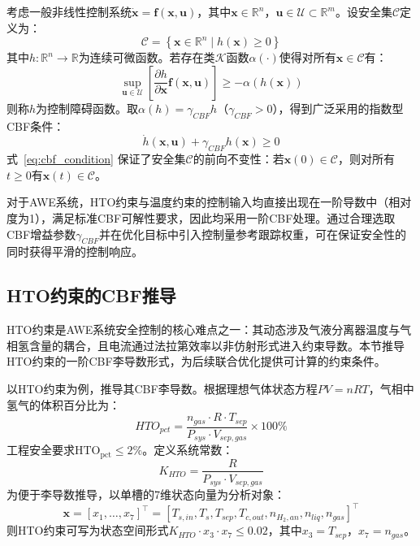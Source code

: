 考虑一般非线性控制系统$\dot{\mathbf{x}} = \mathbf{f}(\mathbf{x}, \mathbf{u})$，其中$\mathbf{x}\in\mathbb{R}^n$，$\mathbf{u}\in\mathcal{U}\subset\mathbb{R}^m$。设安全集$\mathcal{C}$定义为：
\begin{equation}
  \mathcal{C} = \left\{ \mathbf{x}\in\mathbb{R}^n \mid h(\mathbf{x}) \ge 0 \right\}
\end{equation}
其中$h: \mathbb{R}^n \to \mathbb{R}$为连续可微函数。若存在类$\mathcal{K}$函数$\alpha(\cdot)$使得对所有$\mathbf{x}\in\mathcal{C}$有：
\begin{equation}
  \sup_{\mathbf{u}\in\mathcal{U}} \left[ \frac{\partial h}{\partial \mathbf{x}} \mathbf{f}(\mathbf{x}, \mathbf{u}) \right] \ge -\alpha(h(\mathbf{x}))
\end{equation}
则称$h$为控制障碍函数。取$\alpha(h) = \gamma_{CBF} h$（$\gamma_{CBF}>0$），得到广泛采用的指数型CBF条件：
\begin{equation}
  \dot{h}(\mathbf{x}, \mathbf{u}) + \gamma_{CBF} h(\mathbf{x}) \ge 0
\label{eq:cbf_condition}
\end{equation}
式~\eqref{eq:cbf_condition} 保证了安全集$\mathcal{C}$的前向不变性：若$\mathbf{x}(0)\in\mathcal{C}$，则对所有$t\ge 0$有$\mathbf{x}(t)\in\mathcal{C}$。

对于AWE系统，HTO约束与温度约束的控制输入均直接出现在一阶导数中（相对度为1），满足标准CBF可解性要求，因此均采用一阶CBF处理。通过合理选取CBF增益参数$\gamma_{CBF}$并在优化目标中引入控制量参考跟踪权重，可在保证安全性的同时获得平滑的控制响应。

\subsection{HTO约束的CBF推导}

HTO约束是AWE系统安全控制的核心难点之一：其动态涉及气液分离器温度与气相氢含量的耦合，且电流通过法拉第效率以非仿射形式进入约束导数。本节推导HTO约束的一阶CBF李导数形式，为后续联合优化提供可计算的约束条件。

以HTO约束为例，推导其CBF李导数。根据理想气体状态方程$PV=nRT$，气相中氢气的体积百分比为：
\begin{equation}
  HTO_{pct} = \frac{n_{gas} \cdot R \cdot T_{sep}}{P_{sys} \cdot V_{sep,gas}} \times 100\%
\end{equation}
工程安全要求$\mathrm{HTO}_{\mathrm{pct}} \le 2\%$。定义系统常数：
\begin{equation}
  K_{HTO} = \frac{R}{P_{sys} \cdot V_{sep,gas}}
\end{equation}
为便于李导数推导，以单槽的7维状态向量为分析对象：
\begin{equation}
  \mathbf{x} = [x_1, \dots, x_7]^\top = [T_{s,in}, T_s, T_{sep}, T_{c,out}, n_{H_2,an}, n_{liq}, n_{gas}]^\top
\end{equation}
则HTO约束可写为状态空间形式$K_{HTO} \cdot x_3 \cdot x_7 \le 0.02$，其中$x_3 = T_{sep}$，$x_7 = n_{gas}$。

